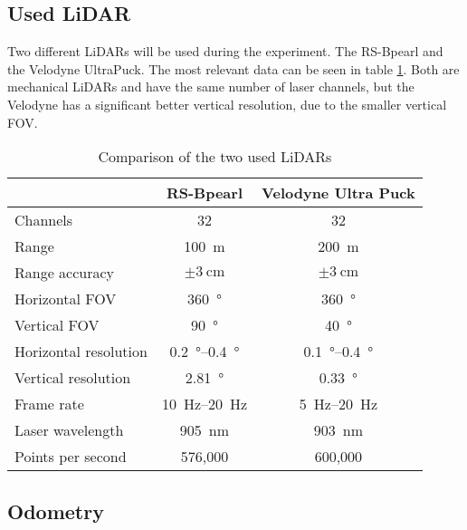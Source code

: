 \subsection{Used LiDAR}
Two different LiDARs will be used during the experiment.
The RS-Bpearl and the Velodyne UltraPuck.
The most relevant data can be seen in table \ref{tab:lidar_datasheets}.
Both are mechanical LiDARs and have the same number of laser channels, but the Velodyne has a significant better vertical resolution, due to the smaller vertical FOV.

\begin{table}[ht]
	\centering
	\caption{Comparison of the two used LiDARs \cite{RoboSense2020}\cite{Rev}}
	\label{tab:lidar_datasheets}
	\begin{tabular}[t]{lcc}
	\toprule
	&RS-Bpearl & Velodyne Ultra Puck\\
	\midrule
	Channels 				& 32 							& 32\\
	Range 					& \SI{100}{\metre}				& \SI{200}{\metre}\\
	Range accuracy			& $\pm\SI{3}{\centi\metre}$		& $\pm\SI{3}{\centi\metre}$\\
	Horizontal FOV		 	& \SI{360}{\degree}				& \SI{360}{\degree}\\
	Vertical FOV 			& \SI{90}{\degree}				& \SI{40}{\degree}\\
	Horizontal resolution	& \SIrange{0.2}{0.4}{\degree} 	& \SIrange{0.1}{0.4}{\degree}\\
	Vertical resolution		& \SI{2.81}{\degree} 			& \SI{0.33}{\degree}\\
	Frame rate 				& \SIrange{10}{20}{\hertz}		& \SIrange{5}{20}{\hertz}\\
	Laser wavelength 		& \SI{905}{\nano\metre} 		& \SI{903}{\nano\metre}\\
	Points per second 		& 576,000						& 600,000		\\
	\bottomrule
	\end{tabular}
	\end{table}%


\subsection{Odometry}

